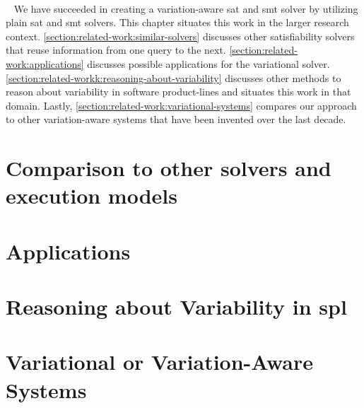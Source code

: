 ~\label{chapter:related-work}


~\label{chapter:related-work}
%
We have succeeded in creating a variation-aware \ac{sat} and \ac{smt} solver by
utilizing plain \ac{sat} and \ac{smt} solvers. This chapter situates this work
in the larger research context. \autoref{section:related-work:similar-solvers}
discusses other satisfiability solvers that reuse information from one query to
the next. \autoref{section:related-work:applications} discusses possible
applications for the variational solver.
\autoref{section:related-workk:reasoning-about-variability} discusses other
methods to reason about variability in software product-lines and situates this
work in that domain. Lastly,
\autoref{section:related-work:variational-systems} compares our approach
to other variation-aware systems that have been invented over the last decade.
%
\section{Comparison to other solvers and execution models}

%
\section{Applications}

%
\section{Reasoning about Variability in \ac{spl}}

%
\section{Variational or Variation-Aware Systems}



